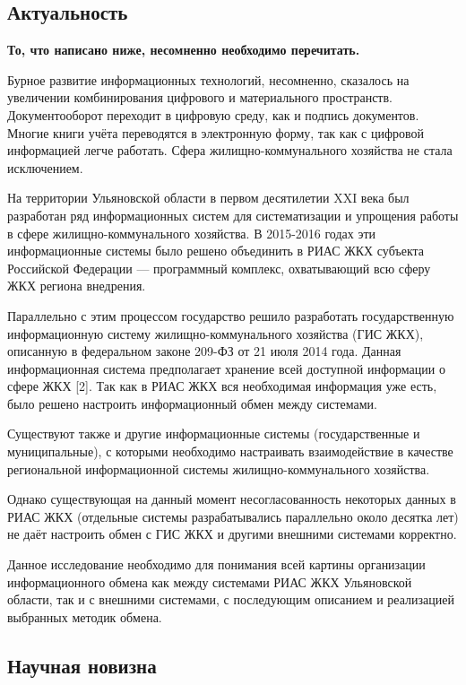 \subsection*{Актуальность}

\textbf{То, что написано ниже, несомненно необходимо перечитать.}

Бурное развитие информационных технологий, несомненно, сказалось на увеличении комбинирования цифрового и материального пространств. 
Документооборот переходит в цифровую среду, как и подпись документов.
Многие книги учёта переводятся в электронную форму, так как с цифровой информацией легче работать.
Сфера жилищно-коммунального хозяйства не стала исключением.

На территории Ульяновской области в первом десятилетии XXI века был разработан ряд информационных систем для систематизации и упрощения работы в сфере жилищно-коммунального хозяйства.
В 2015-2016 годах эти информационные системы было решено объединить в РИАС ЖКХ субъекта Российской Федерации --- программный комплекс, охватывающий всю сферу ЖКХ региона внедрения.

Параллельно с этим процессом государство решило разработать государственную информационную систему жилищно-коммунального хозяйства (ГИС ЖКХ), описанную в федеральном законе 209-ФЗ от 21 июля 2014 года.
Данная информационная система предполагает хранение всей доступной информации о сфере ЖКХ [2]. Так как в РИАС ЖКХ вся необходимая информация уже есть, было решено настроить информационный обмен между системами.

Существуют также и другие информационные системы (государственные и муниципальные), с которыми необходимо настраивать взаимодействие в качестве региональной информационной системы жилищно-коммунального хозяйства.

Однако существующая на данный момент несогласованность некоторых данных в РИАС ЖКХ (отдельные системы разрабатывались параллельно около десятка лет) не даёт настроить обмен с ГИС ЖКХ и другими внешними системами корректно.

Данное исследование необходимо для понимания всей картины организации информационного обмена как между системами РИАС ЖКХ Ульяновской области, так и с внешними системами, с последующим описанием и реализацией выбранных методик обмена.

\subsection*{Научная новизна}

